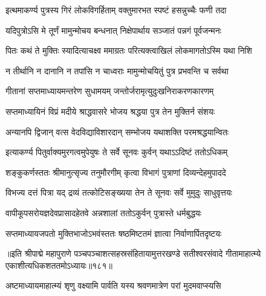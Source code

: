 
\twolineshloka
{इत्थमाकर्ण्य पुत्रस्य गिरं लोकविगर्हिताम्}
{वक्तुमारभत स्पष्टं हसन्नुच्चैः फणी तदा} %


\twolineshloka
{यदिपुत्रोऽसि मे तूर्णं मामुन्मोचय बन्धनात्}
{निक्षेपार्थाय सञ्जातं पन्नगं पूर्वजन्मनः} %


\twolineshloka
{पितः कथं ते मुक्तिः स्यादित्याचक्ष्व ममाग्रतः}
{परित्यक्त्वाखिलं लोकमागतोऽस्मि यथा निशि} %


\twolineshloka
{न तीर्थानि न दानानि न तपांसि न चाध्वराः}
{मामुन्मोचयितुं पुत्र प्रभवन्ति च सर्वथा} %

\twolineshloka
{गीतानां सप्तमाध्यायमन्तरेण सुधामयम्}
{जन्तोर्जरामृत्युदुःखनिराकरणकारणम्} %

\twolineshloka
{सप्तमाध्यायिनं विप्रं मदीये श्राद्धवासरे}
{भोजय श्रद्धया पुत्र तेन मुक्तिर्न संशयः} %

\twolineshloka
{अन्यानपि द्विजान् वत्स वेदविद्याविशारदान्}
{सम्भोजय यथाशक्ति परमश्रद्धयान्वितः} %

\twolineshloka
{इत्याकर्ण्य पितुर्वाक्यमुरगत्वमुपेयुषः}
{ते सर्वे सूनवः कुर्वन् यथाऽऽदिष्टं ततोऽधिकम्} %

\twolineshloka
{शङ्कुकर्णस्ततः श्रीमानुत्सृज्य तनुमौरगीम्}
{कृत्वा विभागं पुत्राणां दिव्यन्देहमुपाददे} %

\twolineshloka
{विभज्य दत्तं पित्रा यद् द्रव्यं तत्कोटिसङ्ख्यया}
{तेन ते सूनवः सर्वे मुमुदुः साधुवृत्तयः} %

\twolineshloka
{वापीकूपसरोयज्ञदेवप्रासादहेतवे}
{अन्नशालां ततोऽकुर्वन् पुत्रास्ते धर्मबुद्धयः} %

\twolineshloka
{सप्तमाध्यायजपतो मुक्तिभाजोऽभवंस्ततः}
{षष्ठमिष्टतमं ज्ञात्वा निर्वाणार्पितदृष्टयः} %

॥इति श्रीपाद्मे महापुराणे पञ्चपञ्चाशत्सहस्रसंहितायामुत्तरखण्डे सतीश्वरसंवादे गीतामाहात्म्ये एकाशीत्यधिकशततमोऽध्यायः॥१८१॥

\genMangalaShloka

\closesub

\ganapatyadiDhyanam
\padmaPuranam



\twolineshloka
{अष्टमाध्यायमाहात्म्यं शृणु वक्ष्यामि पार्वति}
{यस्य श्रवणमात्रेण परां मुदमवाप्स्यसि} %

